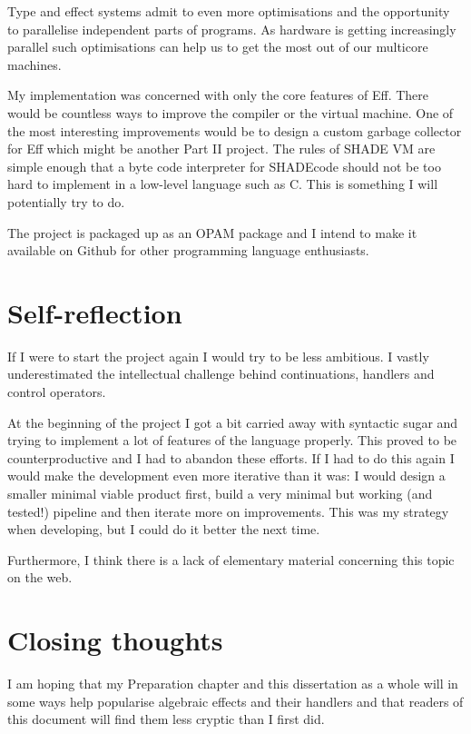 \documentclass[class=article, crop=false]{standalone}
\begin{document}
Type and effect systems admit to even more optimisations and the opportunity to
parallelise independent parts of programs. As hardware is getting increasingly
parallel such optimisations can help us to get the most out of our multicore
machines.

My implementation was concerned with only the core features of Eff. There would
be countless ways to improve the compiler or the virtual machine. One of the
most interesting improvements would be to design a custom garbage collector for
Eff which might be another Part II project. The rules of SHADE VM are simple
enough that a byte code interpreter for SHADEcode should not be too hard to
implement in a low-level language such as C. This is something I will
potentially try to do.

The project is packaged up as an OPAM package and I intend to make it available
on Github for other programming language enthusiasts.

\section{Self-reflection}

If I were to start the project again I would try to be less ambitious. I vastly
underestimated the intellectual challenge behind continuations, handlers and
control operators.

At the beginning of the project I got a bit carried away with syntactic sugar
and trying to implement a lot of features of the language properly. This proved
to be counterproductive and I had to abandon these efforts. If I had to do this
again I would make the development even more iterative than it was: I would
design a smaller minimal viable product first, build a very minimal but working
(and tested!) pipeline and then iterate more on improvements. This was my
strategy when developing, but I could do it better the next time.

Furthermore, I think there is a lack of elementary material concerning this
topic on the web. 

\section{Closing thoughts}

I am hoping that my Preparation chapter and this dissertation as a whole will
in some ways help popularise algebraic effects and their handlers and that
readers of this document will find them less cryptic than I first did.
\end{document}
